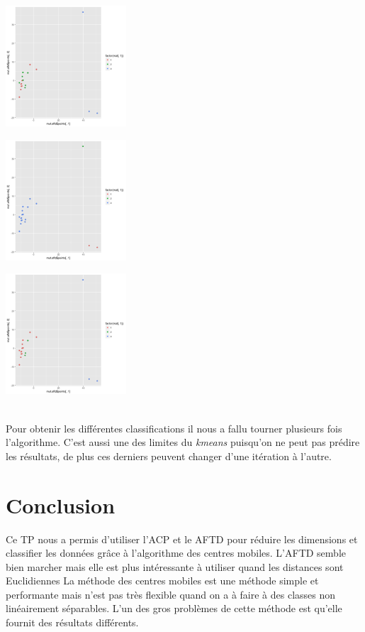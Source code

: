 \documentclass[10pt]{article}
\begin{document}
	\begin{minipage}{.32\textwidth}
	\includegraphics[width=45mm]{Figures/Mutations2_2/kmeans1.png}
	\label{fig:mutations_kmeans2}
\end{minipage}%
\hspace{0.02\linewidth}
\begin{minipage}{.32\textwidth}
	\includegraphics[width=45mm]{Figures/Mutations2_2/kmeans2.png}
	\label{fig:mutations_kmens3}
\end{minipage}
\begin{minipage}{.32\textwidth}
	\includegraphics[width=45mm]{Figures/Mutations2_2/kmeans3.png}
	\label{fig:mutations_kmens4}
\end{minipage}
\vspace{0.02mm}\\
Pour obtenir les différentes classifications il nous a fallu tourner plusieurs fois l'algorithme. C'est aussi une des limites du \textit{kmeans} puisqu'on ne peut pas prédire les résultats, de plus ces derniers peuvent changer d'une itération à l'autre.


\section{Conclusion}
Ce TP nous a permis d'utiliser l'ACP et le AFTD pour réduire les dimensions et classifier les données grâce à l'algorithme des centres mobiles.  L'AFTD semble bien marcher mais elle est plus intéressante à utiliser quand les distances sont Euclidiennes La méthode des centres mobiles est une méthode simple et performante mais n'est pas très flexible quand on a à faire à des classes non linéairement séparables. L'un des gros problèmes de cette méthode est qu'elle fournit des résultats différents.
\end{document}
